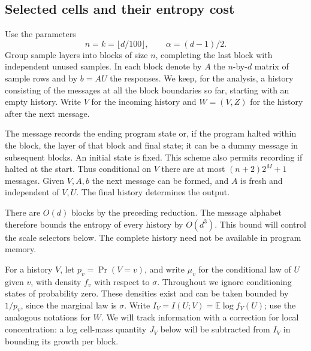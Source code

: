 \subsection{Selected cells and their entropy cost}\label{lc:cell-selection}

Use the parameters
\[
 n=k=\lfloor d/100\rfloor,\qquad \alpha=(d-1)/2.
\]
Group sample layers into blocks of size \(n\), completing the last
block with independent unused samples. In each block denote by \(A\)
the \(n\)-by-\(d\) matrix of sample rows and by \(b=AU\) the responses.
We keep, for the analysis, a history consisting of the messages at all
the block boundaries so far, starting with an empty history. Write
\(V\) for the incoming history and \(W=(V,Z)\) for the history after
the next message.

The message records the ending program state or, if the program halted
within the block, the layer of that block and final state; it can be a
dummy message in subsequent blocks. An initial state is fixed. This
scheme also permits recording if halted at the start. Thus conditional
on \(V\) there are at most \((n+2)2^M+1\) messages. Given \(V,A,b\)
the next message can be formed, and \(A\) is fresh and independent of
\(V,U\). The final history determines the output.

There are \(O(d)\) blocks by the preceding reduction. The message
alphabet therefore bounds the entropy of every history by \(O(d^3)\).
This bound will control the scale selectors below. The complete history
need not be available in program memory.

For a history \(V\), let \(p_v=\Pr(V=v)\), and write \(\mu_v\) for the conditional law of \(U\) given \(v\), with density \(f_v\) with respect to \(\sigma\). Throughout we ignore conditioning states of probability zero. These densities exist and can be taken bounded by \(1/p_v\), since the marginal law is \(\sigma\). Write \(I_V=I(U;V)=\mathbb E\log f_V(U)\); use the analogous notations for \(W\). We will track information with a correction for local concentration: a log cell-mass quantity \(J_V\) below will be subtracted from \(I_V\) in bounding its growth per block.

